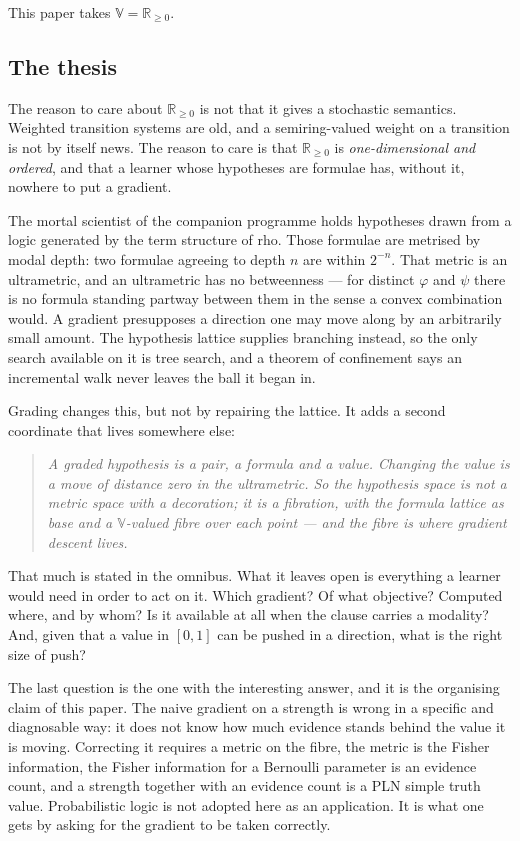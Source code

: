 \documentclass[11pt,a4paper]{article}
\theoremstyle{plain}
\theoremstyle{definition}
\theoremstyle{remark}
\newcommand{\rhoc}{\textsf{rho}}
\newcommand{\V}{\mathbb{V}}
\newcommand{\Rnn}{\mathbb{R}_{\geq 0}}
\begin{document}
This paper takes $\V = \Rnn$.

\subsection{The thesis}\label{ssec:thesis}

The reason to care about $\Rnn$ is not that it gives a stochastic semantics.
Weighted transition systems are old, and a semiring-valued weight on a transition
is not by itself news. The reason to care is that $\Rnn$ is
\emph{one-dimensional and ordered}, and that a learner whose hypotheses are
formulae has, without it, nowhere to put a gradient.

The mortal scientist of the companion programme holds hypotheses drawn from a
logic generated by the term structure of \rhoc{}. Those formulae are metrised by
modal depth: two formulae agreeing to depth $n$ are within $2^{-n}$. That metric
is an ultrametric, and an ultrametric has no betweenness --- for distinct
$\varphi$ and $\psi$ there is no formula standing partway between them in the
sense a convex combination would. A gradient presupposes a direction one may move
along by an arbitrarily small amount. The hypothesis lattice supplies branching
instead, so the only search available on it is tree search, and a theorem of
confinement says an incremental walk never leaves the ball it began in.

Grading changes this, but not by repairing the lattice. It adds a second
coordinate that lives somewhere else:

\begin{quote}\itshape
A graded hypothesis is a pair, a formula and a value. Changing the value is a
move of distance zero in the ultrametric. So the hypothesis space is not a metric
space with a decoration; it is a fibration, with the formula lattice as base and
a $\V$-valued fibre over each point --- and the fibre is where gradient descent
lives.
\end{quote}

That much is stated in the omnibus. What it leaves open is everything a learner
would need in order to act on it. Which gradient? Of what objective? Computed
where, and by whom? Is it available at all when the clause carries a modality?
And, given that a value in $[0,1]$ can be pushed in a direction, what is the
right size of push?

The last question is the one with the interesting answer, and it is the
organising claim of this paper. The naive gradient on a strength is wrong in a
specific and diagnosable way: it does not know how much evidence stands behind
the value it is moving. Correcting it requires a metric on the fibre, the metric
is the Fisher information, the Fisher information for a Bernoulli parameter is an
evidence count, and a strength together with an evidence count is a PLN simple
truth value. Probabilistic logic is not adopted here as an application. It is
what one gets by asking for the gradient to be taken correctly.
\end{document}
